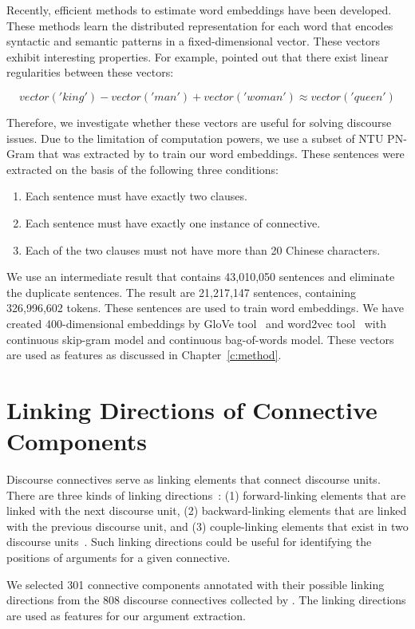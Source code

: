 Recently, efficient methods to estimate word embeddings have been developed.
These methods learn the distributed representation for each word that encodes
syntactic and semantic patterns in a fixed-dimensional vector.
These vectors exhibit interesting properties. For example,
\cite{mikolov2013linguistic} pointed out that there exist linear regularities
between these vectors:

$$ vector('king') - vector('man') + vector('woman') \approx vector('queen') $$

Therefore, we investigate whether these vectors are useful for solving
discourse issues. Due to the limitation of computation powers, we use
a subset of NTU PN-Gram that was extracted by \cite{huang2014interpretation}
to train our word embeddings. These sentences were extracted on the basis of the following three conditions:

\begin{enumerate}
\item Each sentence must have exactly two clauses.
\item Each sentence must have exactly one instance of connective.
\item Each of the two clauses must not have more than 20 Chinese characters.
\end{enumerate}

We use an intermediate result that contains 43,010,050 sentences and eliminate
the duplicate sentences. The result are 21,217,147 sentences, containing
326,996,602 tokens. These sentences are used to train word embeddings.
We have created 400-dimensional embeddings by GloVe tool~\citep{pennington2014glove}
and word2vec tool~\citep{mikolov2013efficient,mikolov2013distributed} with
continuous skip-gram model and continuous bag-of-words model.
These vectors are used as features as discussed in Chapter~\ref{c:method}.


\section{Linking Directions of Connective Components}

Discourse connectives serve as linking elements that connect discourse units.
There are three kinds of linking directions~\citep{li1989mandarin}:
(1) forward-linking elements that are linked with the next discourse unit,
(2) backward-linking elements that are linked with the previous discourse unit,
and (3) couple-linking elements that exist in two discourse units~\citep{chen1994contextual}.
Such linking directions could be useful for identifying the positions of arguments
for a given connective.

We selected 301 connective components annotated with their possible
linking directions from the 808 discourse connectives collected by
\cite{huang2014interpretation}. The linking directions are used as features
for our argument extraction.
